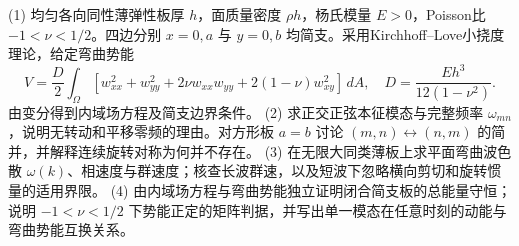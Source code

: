 (1) 均匀各向同性薄弹性板厚 \(h\)，面质量密度 \(\rho h\)，杨氏模量 \(E>0\)，Poisson比 \(-1<\nu<1/2\)。四边分别 \(x=0,a\) 与 \(y=0,b\) 均简支。采用Kirchhoff–Love小挠度理论，给定弯曲势能
\[
V=\frac D2\int_\Omega[w_{xx}^2+w_{yy}^2+2\nu w_{xx}w_{yy}+2(1-\nu)w_{xy}^2]\,dA,\quad D=\frac{Eh^3}{12(1-\nu^2)}.
\]
由变分得到内域场方程及简支边界条件。
(2) 求正交正弦本征模态与完整频率 \(\omega_{mn}\)，说明无转动和平移零频的理由。对方形板 \(a=b\) 讨论 \((m,n)\leftrightarrow(n,m)\) 的简并，并解释连续旋转对称为何并不存在。
(3) 在无限大同类薄板上求平面弯曲波色散 \(\omega(k)\)、相速度与群速度；核查长波群速，以及短波下忽略横向剪切和旋转惯量的适用界限。
(4) 由内域场方程与弯曲势能独立证明闭合简支板的总能量守恒；说明 \(-1<\nu<1/2\) 下势能正定的矩阵判据，并写出单一模态在任意时刻的动能与弯曲势能互换关系。
